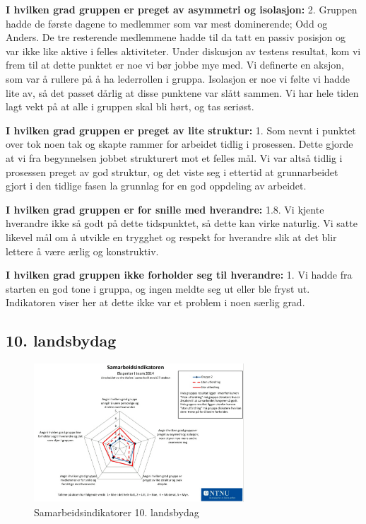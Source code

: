\noindent \textbf{I hvilken grad gruppen er preget av asymmetri og isolasjon:} 2.
\newline
\noindent Gruppen hadde de første dagene to medlemmer som var mest dominerende; Odd og Anders.
De tre resterende medlemmene hadde til da tatt en passiv posisjon og var ikke like aktive i felles aktiviteter. 
Under diskusjon av testens resultat, kom vi frem til at dette punktet er noe vi bør jobbe mye med. Vi definerte en aksjon, som var å rullere på å ha lederrollen i gruppa. 
Isolasjon er noe vi følte vi hadde lite av, så det passet dårlig at disse punktene var slått sammen. Vi har hele tiden lagt vekt på at alle i gruppen skal bli hørt, og tas seriøst. 

\vspace{\secspace}

\noindent \textbf{I hvilken grad gruppen er preget av lite struktur:} 1.
\newline
\noindent Som nevnt i punktet over tok noen tak og skapte rammer for arbeidet tidlig i prosessen. Dette gjorde at vi fra begynnelsen jobbet strukturert mot et felles mål. Vi var altså tidlig i prosessen preget av god struktur, og det viste seg i ettertid at grunnarbeidet gjort i den tidlige fasen la grunnlag for en god oppdeling av arbeidet. 
\vspace{\secspace}

\noindent \textbf{I hvilken grad gruppen er for snille med hverandre:} 1.8.
\newline
\noindent Vi kjente hverandre ikke så godt på dette tidspunktet, så dette kan virke naturlig. Vi satte likevel mål om å utvikle en trygghet og respekt for hverandre slik at det blir lettere å være ærlig og konstruktiv.
\vspace{\secspace}

\noindent \textbf{I hvilken grad gruppen ikke forholder seg til hverandre:} 1.
\newline
\noindent Vi hadde fra starten en god tone i gruppa, og ingen meldte seg ut eller ble fryst ut. Indikatoren viser her at dette ikke var et problem i noen særlig grad.

\subsection{10. landsbydag}
\begin{figure}[H]
    \centering
    \includegraphics[width=0.7\textwidth]{images/sam2.png} 
    \caption{Samarbeidsindikatorer 10. landsbydag}
    \label{fig:sam2}
\end{figure}

